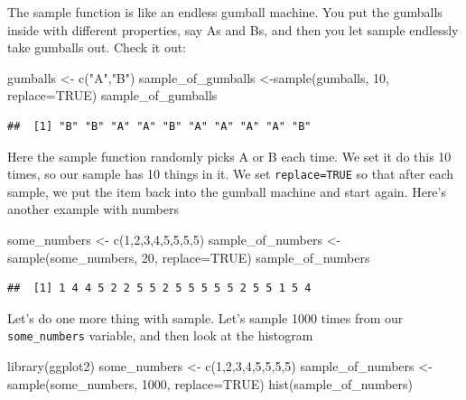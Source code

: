 \documentclass[
]{book}
\newenvironment{Shaded}{\begin{snugshade}}{\end{snugshade}}
\newcommand{\AttributeTok}[1]{\textcolor[rgb]{0.77,0.63,0.00}{#1}}
\newcommand{\ConstantTok}[1]{\textcolor[rgb]{0.00,0.00,0.00}{#1}}
\newcommand{\DecValTok}[1]{\textcolor[rgb]{0.00,0.00,0.81}{#1}}
\newcommand{\FunctionTok}[1]{\textcolor[rgb]{0.00,0.00,0.00}{#1}}
\newcommand{\NormalTok}[1]{#1}
\newcommand{\OtherTok}[1]{\textcolor[rgb]{0.56,0.35,0.01}{#1}}
\newcommand{\StringTok}[1]{\textcolor[rgb]{0.31,0.60,0.02}{#1}}
\begin{document}
The sample function is like an endless gumball machine. You put the gumballs inside with different properties, say As and Bs, and then you let sample endlessly take gumballs out. Check it out:

\begin{Shaded}
\begin{Highlighting}[]
\NormalTok{gumballs }\OtherTok{\textless{}{-}} \FunctionTok{c}\NormalTok{(}\StringTok{"A"}\NormalTok{,}\StringTok{"B"}\NormalTok{)}
\NormalTok{sample\_of\_gumballs }\OtherTok{\textless{}{-}}\FunctionTok{sample}\NormalTok{(gumballs, }\DecValTok{10}\NormalTok{, }\AttributeTok{replace=}\ConstantTok{TRUE}\NormalTok{)}
\NormalTok{sample\_of\_gumballs}
\end{Highlighting}
\end{Shaded}

\begin{verbatim}
##  [1] "B" "B" "A" "A" "B" "A" "A" "A" "A" "B"
\end{verbatim}

Here the sample function randomly picks A or B each time. We set it do this 10 times, so our sample has 10 things in it. We set \texttt{replace=TRUE} so that after each sample, we put the item back into the gumball machine and start again. Here's another example with numbers

\begin{Shaded}
\begin{Highlighting}[]
\NormalTok{some\_numbers }\OtherTok{\textless{}{-}} \FunctionTok{c}\NormalTok{(}\DecValTok{1}\NormalTok{,}\DecValTok{2}\NormalTok{,}\DecValTok{3}\NormalTok{,}\DecValTok{4}\NormalTok{,}\DecValTok{5}\NormalTok{,}\DecValTok{5}\NormalTok{,}\DecValTok{5}\NormalTok{,}\DecValTok{5}\NormalTok{)}
\NormalTok{sample\_of\_numbers }\OtherTok{\textless{}{-}}\FunctionTok{sample}\NormalTok{(some\_numbers, }\DecValTok{20}\NormalTok{, }\AttributeTok{replace=}\ConstantTok{TRUE}\NormalTok{)}
\NormalTok{sample\_of\_numbers}
\end{Highlighting}
\end{Shaded}

\begin{verbatim}
##  [1] 1 4 4 5 2 2 5 5 2 5 5 5 5 5 2 5 5 1 5 4
\end{verbatim}

Let's do one more thing with sample. Let's sample 1000 times from our \texttt{some\_numbers} variable, and then look at the histogram

\begin{Shaded}
\begin{Highlighting}[]
\FunctionTok{library}\NormalTok{(ggplot2)}
\NormalTok{some\_numbers }\OtherTok{\textless{}{-}} \FunctionTok{c}\NormalTok{(}\DecValTok{1}\NormalTok{,}\DecValTok{2}\NormalTok{,}\DecValTok{3}\NormalTok{,}\DecValTok{4}\NormalTok{,}\DecValTok{5}\NormalTok{,}\DecValTok{5}\NormalTok{,}\DecValTok{5}\NormalTok{,}\DecValTok{5}\NormalTok{)}
\NormalTok{sample\_of\_numbers }\OtherTok{\textless{}{-}}\FunctionTok{sample}\NormalTok{(some\_numbers, }\DecValTok{1000}\NormalTok{, }\AttributeTok{replace=}\ConstantTok{TRUE}\NormalTok{)}
\FunctionTok{hist}\NormalTok{(sample\_of\_numbers)}
\end{Highlighting}
\end{Shaded}
\end{document}
